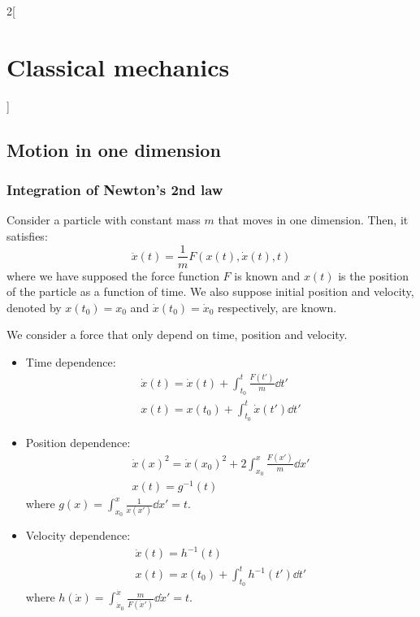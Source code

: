 \documentclass[../../../main.tex]{subfiles}
\begin{document}
\begin{multicols}{2}[\section{Classical mechanics}]
  \subsection{Motion in one dimension}
  \subsubsection{Integration of Newton's 2nd law}
  \begin{prop}
    Consider a particle with constant mass $m$ that moves in one dimension. Then, it satisfies: $$\ddot{x}(t)=\frac{1}{m}F(x(t),\dot{x}(t),t)$$
    where we have supposed the force function $F$ is known and $x(t)$ is the position of the particle as a function of time. We also suppose initial position and velocity, denoted by $x(t_0)=x_0$ and $\dot{x}(t_0)=\dot{x}_0$ respectively, are known.
  \end{prop}
  \begin{prop}
    We consider a force that only depend on time, position and velocity.
    \begin{itemize}
      \item Time dependence:
            \begin{gather*}
              \dot{x}(t)=\dot{x}(t)+\int_{t_0}^t\frac{F(t')}{m}\dd t'\\
              x(t)=x(t_0)+\int_{t_0}^t\dot{x}(t')\dd t'
            \end{gather*}
      \item Position dependence:
            \begin{gather*}
              {\dot{x}(x)}^2={\dot{x}(x_0)}^2+2\int_{x_0}^x\frac{F(x')}{m}\dd x'\\
              x(t)=g^{-1}(t)
            \end{gather*}
            where $\displaystyle g(x)=\int_{x_0}^x\frac{1}{\dot{x}(x')}\dd x'=t$.
      \item Velocity dependence:
            \begin{gather*}
              \dot{x}(t)=h^{-1}(t)\\
              x(t)=x(t_0)+\int_{t_0}^th^{-1}(t')\dd t'
            \end{gather*}
            where $\displaystyle h(\dot{x})=\int_{\dot{x}_0}^{\dot{x}}\frac{m}{F(\dot{x}')}\dd\dot{x}'=t$.
    \end{itemize}
  \end{prop}

\end{multicols}
\end{document}
